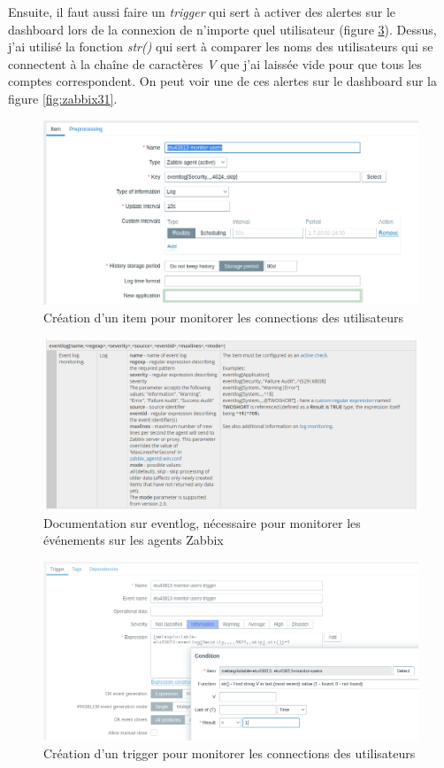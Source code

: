 \documentclass[a4paper]{article}
\begin{document}
Ensuite, il faut aussi faire un \textit{trigger} qui sert à activer des alertes sur le dashboard lors de la connexion de n'importe quel utilisateur (figure \ref{fig:zabbix35}). Dessus, j'ai utilisé la fonction \textit{str()} qui sert à comparer les noms des utilisateurs qui se connectent à la chaîne de caractères \textit{V} que j'ai laissée vide pour que tous les comptes correspondent. On peut voir une de ces alertes sur le dashboard sur la figure \ref{fig:zabbix31}.

\begin{figure}[H]
    \centering
    \includegraphics[width=0.95\linewidth]{images/zabbix-32.png}
    \caption{Création d'un item pour monitorer les connections des utilisateurs}
    \label{fig:zabbix32}
\end{figure}
\begin{figure}[H]
    \centering
    \includegraphics[width=0.95\linewidth]{images/zabbix-29.png}
    \caption{Documentation sur eventlog, nécessaire pour monitorer les événements sur les agents Zabbix}
    \label{fig:zabbix29}
\end{figure}
\begin{figure}[H]
    \centering
    \includegraphics[width=0.95\linewidth]{images/zabbix-35.png}
    \caption{Création d'un trigger pour monitorer les connections des utilisateurs}
    \label{fig:zabbix35}
\end{figure}
\end{document}
